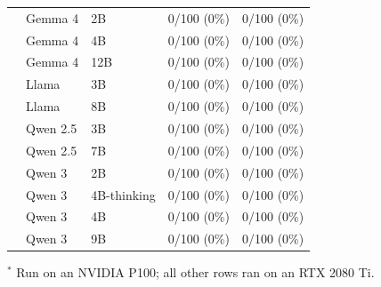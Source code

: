 \begin{reviewed}
\begin{table}[H]
\begin{tabular}{>{\raggedright\arraybackslash}p{2.2cm} l l c c}
& Gemma 4           & 2B           & 0/100 (0\%)  & 0/100 (0\%)  \\
& Gemma 4           & 4B           & 0/100 (0\%)  & 0/100 (0\%)  \\
& Gemma 4           & 12B          & 0/100 (0\%)  & 0/100 (0\%)  \\
& Llama             & 3B           & 0/100 (0\%)  & 0/100 (0\%)  \\
& Llama             & 8B           & 0/100 (0\%)  & 0/100 (0\%)  \\
& Qwen 2.5          & 3B           & 0/100 (0\%)  & 0/100 (0\%)  \\
& Qwen 2.5          & 7B           & 0/100 (0\%)  & 0/100 (0\%)  \\
& Qwen 3            & 2B           & 0/100 (0\%)  & 0/100 (0\%)  \\
& Qwen 3            & 4B-thinking  & 0/100 (0\%)  & 0/100 (0\%)  \\
& Qwen 3            & 4B           & 0/100 (0\%)  & 0/100 (0\%)  \\
& Qwen 3            & 9B           & 0/100 (0\%)  & 0/100 (0\%)  \\
\bottomrule
\end{tabular}

\par\vspace{2pt}
{\footnotesize $^{*}$ Run on an NVIDIA P100; all other rows ran on an RTX 2080 Ti.\par}
\end{table}

\end{reviewed}